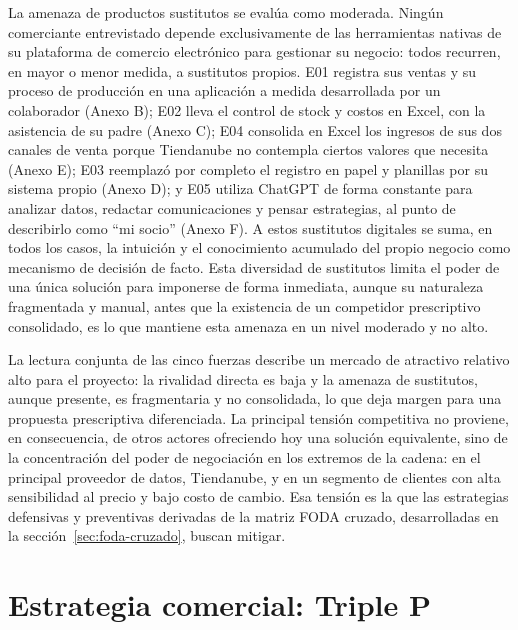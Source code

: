 La amenaza de productos sustitutos se evalúa como moderada. Ningún comerciante entrevistado depende exclusivamente de las herramientas nativas de su plataforma de comercio electrónico para gestionar su negocio: todos recurren, en mayor o menor medida, a sustitutos propios. E01 registra sus ventas y su proceso de producción en una aplicación a medida desarrollada por un colaborador (Anexo B); E02 lleva el control de stock y costos en Excel, con la asistencia de su padre (Anexo C); E04 consolida en Excel los ingresos de sus dos canales de venta porque Tiendanube no contempla ciertos valores que necesita (Anexo E); E03 reemplazó por completo el registro en papel y planillas por su sistema propio (Anexo D); y E05 utiliza ChatGPT de forma constante para analizar datos, redactar comunicaciones y pensar estrategias, al punto de describirlo como \enquote{mi socio} (Anexo F). A estos sustitutos digitales se suma, en todos los casos, la intuición y el conocimiento acumulado del propio negocio como mecanismo de decisión de facto. Esta diversidad de sustitutos limita el poder de una única solución para imponerse de forma inmediata, aunque su naturaleza fragmentada y manual, antes que la existencia de un competidor prescriptivo consolidado, es lo que mantiene esta amenaza en un nivel moderado y no alto.

La lectura conjunta de las cinco fuerzas describe un mercado de atractivo relativo alto para el proyecto: la rivalidad directa es baja y la amenaza de sustitutos, aunque presente, es fragmentaria y no consolidada, lo que deja margen para una propuesta prescriptiva diferenciada. La principal tensión competitiva no proviene, en consecuencia, de otros actores ofreciendo hoy una solución equivalente, sino de la concentración del poder de negociación en los extremos de la cadena: en el principal proveedor de datos, Tiendanube, y en un segmento de clientes con alta sensibilidad al precio y bajo costo de cambio. Esa tensión es la que las estrategias defensivas y preventivas derivadas de la matriz FODA cruzado, desarrolladas en la sección~\ref{sec:foda-cruzado}, buscan mitigar.

\section{Estrategia comercial: Triple P}
\label{sec:triple-p}

